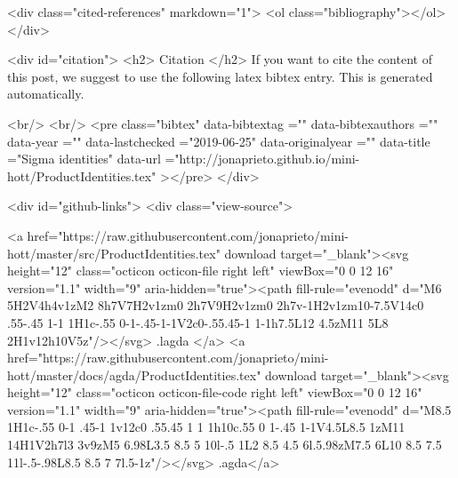   <div class="cited-references" markdown="1">
  <ol class="bibliography"></ol>
  </div>


  
  <div id="citation">
  <h2> Citation </h2>
  If you want to cite the content of this post,
  we suggest to use the following latex bibtex entry.
  This is generated automatically.

  <br/>
  <br/>
  <pre class="bibtex"
       data-bibtextag =""
       data-bibtexauthors =""
       data-year =""
       data-lastchecked ="2019-06-25"
       data-originalyear =""
       data-title ="Sigma identities"
       data-url ="http://jonaprieto.github.io/mini-hott/ProductIdentities.tex"
  ></pre>
  </div>
  

  <div id="github-links">
    <div class="view-source">
      
        <a href="https://raw.githubusercontent.com/jonaprieto/mini-hott/master/src/ProductIdentities.tex" download target="_blank"><svg height="12" class="octicon octicon-file right left" viewBox="0 0 12 16" version="1.1" width="9" aria-hidden="true"><path fill-rule="evenodd" d="M6 5H2V4h4v1zM2 8h7V7H2v1zm0 2h7V9H2v1zm0 2h7v-1H2v1zm10-7.5V14c0 .55-.45 1-1 1H1c-.55 0-1-.45-1-1V2c0-.55.45-1 1-1h7.5L12 4.5zM11 5L8 2H1v12h10V5z"/></svg> .lagda </a>
        <a href="https://raw.githubusercontent.com/jonaprieto/mini-hott/master/docs/agda/ProductIdentities.tex" download target="_blank"><svg height="12" class="octicon octicon-file-code right left" viewBox="0 0 12 16" version="1.1" width="9" aria-hidden="true"><path fill-rule="evenodd" d="M8.5 1H1c-.55 0-1 .45-1 1v12c0 .55.45 1 1 1h10c.55 0 1-.45 1-1V4.5L8.5 1zM11 14H1V2h7l3 3v9zM5 6.98L3.5 8.5 5 10l-.5 1L2 8.5 4.5 6l.5.98zM7.5 6L10 8.5 7.5 11l-.5-.98L8.5 8.5 7 7l.5-1z"/></svg> .agda</a>
      
